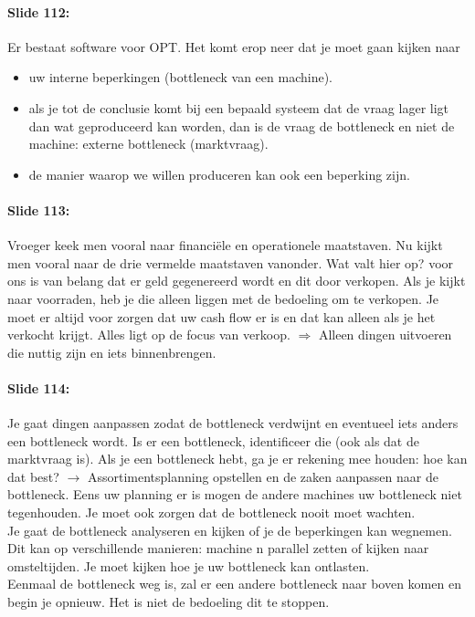 \documentclass[10pt,a4paper]{report}
\begin{document}
\paragraph{Slide 112:} Er bestaat software voor OPT. Het komt erop neer dat je moet gaan kijken naar 
\begin{itemize}
\item uw interne beperkingen (bottleneck van een machine).
\item als je tot de conclusie komt bij een bepaald systeem dat de vraag lager ligt dan wat geproduceerd kan worden, dan is de vraag de bottleneck en niet de machine: externe bottleneck (marktvraag). 
\item de manier waarop we willen produceren kan ook een beperking zijn.
\end{itemize}

\paragraph{Slide 113:} Vroeger keek men vooral naar financi\"ele en operationele maatstaven. Nu kijkt men vooral naar de drie vermelde maatstaven vanonder. Wat valt hier op? voor ons is van belang dat er geld gegenereerd wordt en dit door verkopen. Als je kijkt naar voorraden, heb je die alleen liggen met de bedoeling om te verkopen. Je moet er altijd voor zorgen dat uw cash flow er is en dat kan alleen als je het verkocht krijgt. Alles ligt op de focus van verkoop. $\Rightarrow$ Alleen dingen uitvoeren die nuttig zijn en iets binnenbrengen.

\paragraph{Slide 114:} Je gaat dingen aanpassen zodat de bottleneck verdwijnt en eventueel iets anders een bottleneck wordt. Is er een bottleneck, identificeer die (ook als dat de marktvraag is). Als je een bottleneck hebt, ga je er rekening mee houden: hoe kan dat best? $\rightarrow$ Assortimentsplanning opstellen en de zaken aanpassen naar de bottleneck. Eens uw planning er is mogen de andere machines uw bottleneck niet tegenhouden. Je moet ook zorgen dat de bottleneck nooit moet wachten.\\
Je gaat de bottleneck analyseren en kijken of je de beperkingen kan wegnemen. Dit kan op verschillende manieren: machine n parallel zetten of kijken naar omsteltijden. Je moet kijken hoe je uw bottleneck kan ontlasten.\\
Eenmaal de bottleneck weg is, zal er een andere bottleneck naar boven komen en begin je opnieuw. Het is niet de bedoeling dit te stoppen.
\end{document}

